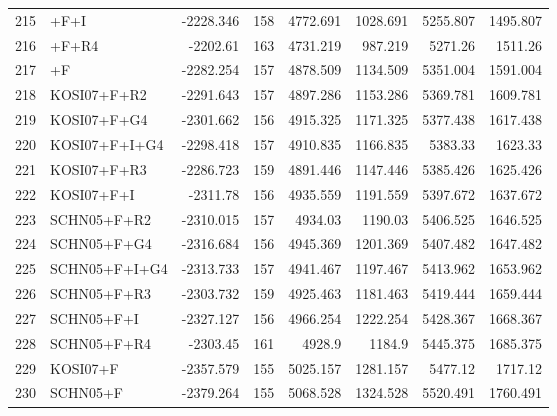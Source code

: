 \begin{longtable}{clrrrrrr}
	215 & \gy+F+I & -2228.346 & 158 & 4772.691 & 1028.691 & 5255.807 & 1495.807 \\ 
	216 & \gy+F+R4 & -2202.61 & 163 & 4731.219 & 987.219 & 5271.26 & 1511.26 \\ 
	217 & \gy+F & -2282.254 & 157 & 4878.509 & 1134.509 & 5351.004 & 1591.004 \\ 
	218 & KOSI07+F+R2 & -2291.643 & 157 & 4897.286 & 1153.286 & 5369.781 & 1609.781 \\ 
	219 & KOSI07+F+G4 & -2301.662 & 156 & 4915.325 & 1171.325 & 5377.438 & 1617.438 \\ 
	220 & KOSI07+F+I+G4 & -2298.418 & 157 & 4910.835 & 1166.835 & 5383.33 & 1623.33 \\ 
	221 & KOSI07+F+R3 & -2286.723 & 159 & 4891.446 & 1147.446 & 5385.426 & 1625.426 \\ 
	222 & KOSI07+F+I & -2311.78 & 156 & 4935.559 & 1191.559 & 5397.672 & 1637.672 \\ 
	223 & SCHN05+F+R2 & -2310.015 & 157 & 4934.03 & 1190.03 & 5406.525 & 1646.525 \\ 
	224 & SCHN05+F+G4 & -2316.684 & 156 & 4945.369 & 1201.369 & 5407.482 & 1647.482 \\ 
	225 & SCHN05+F+I+G4 & -2313.733 & 157 & 4941.467 & 1197.467 & 5413.962 & 1653.962 \\ 
	226 & SCHN05+F+R3 & -2303.732 & 159 & 4925.463 & 1181.463 & 5419.444 & 1659.444 \\ 
	227 & SCHN05+F+I & -2327.127 & 156 & 4966.254 & 1222.254 & 5428.367 & 1668.367 \\ 
	228 & SCHN05+F+R4 & -2303.45 & 161 & 4928.9 & 1184.9 & 5445.375 & 1685.375 \\ 
	229 & KOSI07+F & -2357.579 & 155 & 5025.157 & 1281.157 & 5477.12 & 1717.12 \\ 
	230 & SCHN05+F & -2379.264 & 155 & 5068.528 & 1324.528 & 5520.491 & 1760.491 \\
\end{longtable}

\clearpage

